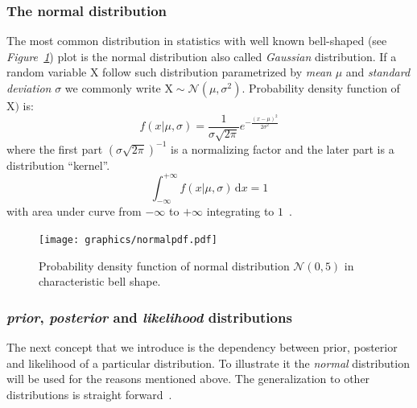 \documentclass[12pt, a4paper, pdflatex, leqno]{report}
\begin{document}
\subsubsection{The normal distribution}
The most common distribution in statistics with well known bell-shaped (see \emph{Figure~\ref{fig:normaldist}}) plot is the normal distribution also called \emph{Gaussian} distribution. If a random variable $\mathrm{X}$ follow such distribution parametrized by \emph{mean} $\mu$ and \emph{standard deviation} $\sigma$ we commonly write $\mathrm{X} \sim \mathcal{N}\left( \mu, \sigma^2 \right)$. Probability density function of $\mathrm{X})$ is:
$$
f \left(x | \mu, \sigma \right) = \frac{1}{\sigma \sqrt{2 \pi }} e^{- \frac{ {\left (  x - \mu \right )}^2 }{2 \sigma^2} }
$$
where the first part ${\left( \sigma \sqrt{2 \pi } \right)}^{-1}$ is a normalizing factor and the later part is a distribution ``kernel''.
$$
\int_{-\infty}^{+\infty} \! f \left(x | \mu, \sigma \right) \, \mathrm{d}x = 1
$$
with area under curve from $-\infty$ to $+\infty$ integrating to $1$~\citep{rice1995mathematical}.


\begin{figure}[htbp]
\centering
\texttt{[image: graphics/normalpdf.pdf]}
\begin{tiny}
\caption{Probability density function of normal distribution $\mathcal{N}\left( 0, 5 \right)$ in characteristic bell shape.\label{fig:normaldist}}
\end{tiny}
\vspace{1cm}
\end{figure}



\subsubsection{\emph{prior}, \emph{posterior} and \emph{likelihood} distributions}
The next concept that we introduce is the dependency between prior, posterior and likelihood of a particular distribution. To illustrate it the \emph{normal} distribution will be used for the reasons mentioned above. The generalization to other distributions is straight forward~\citep{gelman2003bayesian}.\\
\end{document}
